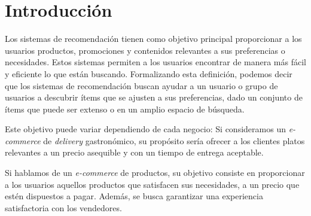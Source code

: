 \documentclass[11pt,a4paper,twoside]{thesis}
\begin{document}

\def\autor{Adrian Norberto Marino}
\def\tituloTesis{Sistemas de Recomendación Colaborativos}
\def\runtitulo{Resumen}
\def\runtitle{Sistemas de Recomendación Colaborativos}


\def\lugar{Buenos Aires, 2022}


%
\frontmatter
\pagestyle{empty}

%
%
\cleardoublepage
%
%
%
\tableofcontents
%
%
\mainmatter
\pagestyle{headings}
%
%
%
%


\chapter{Introducción}

Los sistemas de recomendación tienen como objetivo principal proporcionar a los
usuarios productos, promociones y contenidos relevantes a sus preferencias o
necesidades. Estos sistemas permiten a los usuarios encontrar de manera más
fácil y eficiente lo que están buscando. Formalizando esta definición, podemos
decir que los sistemas de recomendación buscan ayudar a un usuario o grupo de
usuarios a descubrir ítems que se ajusten a sus preferencias, dado un conjunto
de ítems que puede ser extenso o en un amplio espacio de búsqueda.

Este objetivo puede variar dependiendo de cada negocio: Si consideramos un
\textit{e-commerce} de \textit{delivery} gastronómico, su propósito sería
ofrecer a los clientes platos relevantes a un precio asequible y con un tiempo
de entrega aceptable.

Si hablamos de un \textit{e-commerce} de productos, su objetivo consiste en
proporcionar a los usuarios aquellos productos que satisfacen sus necesidades,
a un precio que estén dispuestos a pagar. Además, se busca garantizar una
experiencia satisfactoria con los vendedores.
\end{document}
